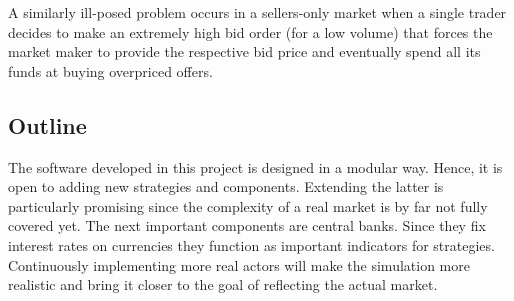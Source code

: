 A similarly ill-posed problem occurs in a sellers-only market when a single trader
decides to make an extremely high bid order (for a low volume) that forces the market
maker to provide the respective bid price and eventually spend all its funds at buying
overpriced offers.

\subsection{Outline}
The software developed in this project is designed in a modular way. Hence, it is open
to adding new strategies and components. Extending the latter is particularly
promising since the complexity of a real market is by far not fully covered yet. The next
important components are central banks. Since they fix interest rates on currencies
they function as important indicators for strategies. Continuously implementing more
real actors will make the simulation more realistic and bring it closer to the goal
of reflecting the actual market.


%
%
%
%
%
%
%
%
%
%
%
%
%

